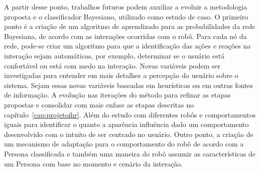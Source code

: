 A partir desse ponto, trabalhos futuros podem auxiliar a evoluir a metodologia proposta e o classificador Bayesiano, utilizado como estudo de caso. O primeiro ponto é a criação de um algoritmo de aprendizado para as probabilidades da rede Bayesiana, de acordo com as interações ocorridas com o robô. Para cada nó da rede, pode-se criar um algoritmo para que a identificação das ações e reações na interação sejam automáticas, por exemplo, determinar se o usuário está confortável ou está com medo na interação. Novas variáveis podem ser investigadas para entender em mais detalhes a percepção do usuário sobre o sistema. Sejam essas novas variáveis baseadas em heurísticas ou em outras fontes de informação. A evolução nas iterações do método para refinar as etapas propostas e consolidar com mais enfase as etapas descritas no capítulo~\ref{cap:projetoihr}. Além do estudo com diferentes robôs e comportamentos iguais para identificar o quanto a aparência influência dado um comportamento desenvolvido com o intuito de ser centrado no usuário. Outro ponto, a criação de um mecanismo de adaptação para o comportamento do robô de acordo com a Persona classificada e também uma maneira do robô assumir as características de um Persona com base no momento e cenário da interação.